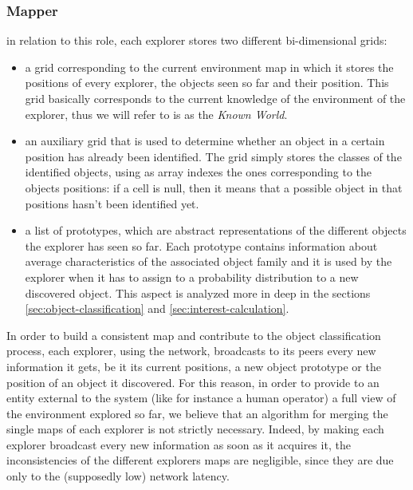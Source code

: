 \documentclass[a4paper, 10pt, conference]{ieeeconf}      %
\begin{document}
\subsubsection{Mapper} in relation to this role, each explorer stores two different bi-dimensional grids: 
\begin{itemize}
    \item a grid corresponding to the current environment map in which it stores the positions of every explorer, the objects seen so far and their position. This grid basically corresponds to the current knowledge of the environment of the explorer, thus we will refer to is as the \emph{Known World}.
    \item an auxiliary grid that is used to determine whether an object in a certain position has already been identified. The grid simply stores the classes of the identified objects, using as array indexes the ones corresponding to the objects positions: if a cell is null, then it means that a possible object in that positions hasn't been identified yet. 
    \item a list of prototypes, which are abstract representations of the different objects the explorer has seen so far. Each prototype contains information about average characteristics of the associated object family and it is used by the explorer when it has to assign to a probability distribution to a new discovered object. This aspect is analyzed more in deep in the sections \ref{sec:object-classification} and \ref{sec:interest-calculation}. 
\end{itemize}

In order to build a consistent map and contribute to the object classification process, each explorer, using the network, broadcasts to its peers every new information it gets, be it its current positions, a new object prototype or the position of an object it discovered. For this reason, in order to provide to an entity external to the system (like for instance a human operator) a full view of the environment explored so far, we believe that an algorithm for merging the single maps of each explorer is not strictly necessary. Indeed, by making each explorer broadcast every new information as soon as it acquires it, the inconsistencies of the different explorers maps are negligible, since they are due only to the (supposedly low) network latency. %
\end{document}
